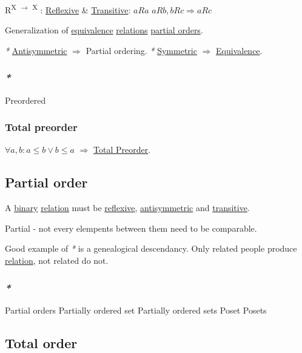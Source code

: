 \documentclass[a4paper,14pt,oneside]{book}
\begin{document}
R\textsuperscript{X \(\to\) X} : \hyperref[orgf88b540]{Reflexive} \& \hyperref[orgae6403a]{Transitive}:
\(aRa\)
\(aRb, bRc \Rightarrow aRc\)

Generalization of \hyperref[org7104979]{equivalence} \hyperref[org5d1ca7a]{relations} \hyperref[org5c10560]{partial orders}.

\emph{*} \hyperref[org946763e]{Antisymmetric} \(\Rightarrow\) Partial ordering.
\emph{*} \hyperref[org725e9f8]{Symmetric} \(\Rightarrow\) \hyperref[org7104979]{Equivalence}.

\subsubsection{\emph{*}}
\label{sec:orga8aacaf}

\label{orgb1b3df4}Preordered

\subsubsection{\label{org078f5e4}Total preorder}
\label{sec:org9dc7c58}

\(\forall a,b : a \le b \lor b \le a\) \(\Rightarrow\) \hyperref[org078f5e4]{Total Preorder}.

\subsection{\label{org54a3281}Partial order}
\label{sec:org8c30c9e}

A \hyperref[org60ae3a8]{binary} \hyperref[orgf3860df]{relation} must be \hyperref[orgf88b540]{reflexive}, \hyperref[org946763e]{antisymmetric} and \hyperref[orgae6403a]{transitive}.

Partial - not every elempents between them need to be comparable.

Good example of \emph{*} is a genealogical descendancy. Only related people produce \hyperref[orgf3860df]{relation}, not related do not.

\subsubsection{\emph{*}}
\label{sec:org44cc541}

\label{org5c10560}Partial orders
\label{org539b118}Partially ordered set
\label{org67d3ead}Partially ordered sets
\label{org44686cc}Poset
\label{org838a88e}Posets


\subsection{\label{org6684aef}Total order}
\label{sec:org3fcb72a}
\end{document}
